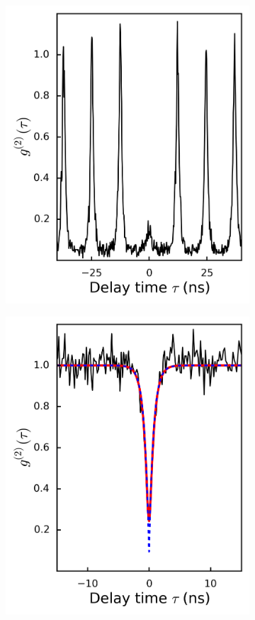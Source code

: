 \begin{figure}[h!] \begin{subfigure}{0.49\textwidth}
\includegraphics[width=1\textwidth]{images/g2_pulse.png} \label{fig:g2p}
\end{subfigure} \begin{subfigure}{0.49\textwidth}
\includegraphics[width=1\textwidth]{images/g2_cw.png} \label{fig:g2cw}

\end{subfigure}
\end{figure}
